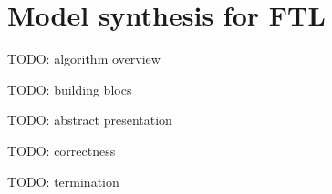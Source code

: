 
\section{Model synthesis for FTL}
\label{sec:synthesis}

TODO: algorithm overview

TODO: building blocs

TODO: abstract presentation

TODO: correctness

TODO: termination

